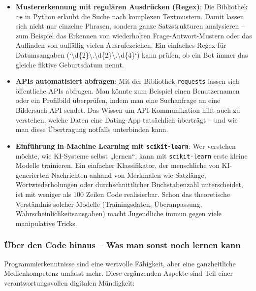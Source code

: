 \documentclass[12pt,a4paper,oneside]{scrartcl}
\begin{document}
	\begin{itemize}
		\item \textbf{Mustererkennung mit regulären Ausdrücken (Regex)}: Die Bibliothek \texttt{re} in Python erlaubt die Suche nach komplexen Textmustern. Damit lassen sich nicht nur einzelne Phrasen, sondern ganze Satzstrukturen analysieren – zum Beispiel das Erkennen von wiederholten Frage-Antwort-Mustern oder das Auffinden von auffällig vielen Ausrufezeichen. Ein einfaches Regex für Datumsangaben (`\textbackslash d\{2\}\textbackslash .\textbackslash d\{2\}\textbackslash .\textbackslash d\{4\}`) kann prüfen, ob ein Bot immer das gleiche fiktive Geburtsdatum nennt.
		
		\item \textbf{APIs automatisiert abfragen}: Mit der Bibliothek \texttt{requests} lassen sich öffentliche APIs abfragen. Man könnte zum Beispiel einen Benutzernamen oder ein Profilbild überprüfen, indem man eine Suchanfrage an eine Bildersuch-API sendet. Das Wissen um API-Kommunikation hilft auch zu verstehen, welche Daten eine Dating-App tatsächlich überträgt – und wie man diese Übertragung notfalls unterbinden kann.
		
		\item \textbf{Einführung in Machine Learning mit \texttt{scikit-learn}}: Wer verstehen möchte, wie KI-Systeme selbst „lernen“, kann mit \texttt{scikit-learn} erste kleine Modelle trainieren. Ein einfacher Klassifikator, der menschliche von KI-generierten Nachrichten anhand von Merkmalen wie Satzlänge, Wortwiederholungen oder durchschnittlicher Buchstabenzahl unterscheidet, ist mit weniger als 100 Zeilen Code realisierbar. Schon das theoretische Verständnis solcher Modelle (Trainingsdaten, Überanpassung, Wahrscheinlichkeitsausgaben) macht Jugendliche immun gegen viele manipulative Tricks.
	\end{itemize}
	
	\subsubsection{Über den Code hinaus – Was man sonst noch lernen kann}
	
	Programmierkenntnisse sind eine wertvolle Fähigkeit, aber eine ganzheitliche Medienkompetenz umfasst mehr. Diese ergänzenden Aspekte sind Teil einer verantwortungsvollen digitalen Mündigkeit:
	
\end{document}
